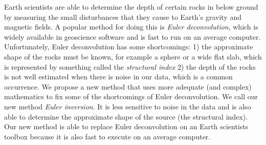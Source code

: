 Earth scientists are able to determine the depth of certain rocks in below ground by measuring the small disturbances that they cause to Earth's gravity and magnetic fields.
A popular method for doing this is \textit{Euler deconvolution}, which is widely available in geoscience software and is fast to run on an average computer. 
Unfortunately, Euler deconvolution has some shortcomings: 1) the approximate shape of the rocks must be known, for example a sphere or a wide flat slab, which is represented by something called the \textit{structural index} 2) the depth of the rocks is not well estimated when there is noise in our data, which is a common occurrence.
We propose a new method that uses more adequate (and complex) mathematics to fix some of the shortcomings of Euler deconvolution.
We call our new method \textit{Euler inversion}.
It is less sensitive to noise in the data and is also able to determine the approximate shape of the source (the structural index).
Our new method is able to replace Euler deconvolution on an Earth scientists toolbox because it is also fast to execute on an average computer.